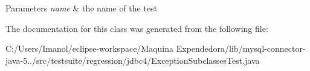 \begin{DoxyParams}{Parameters}
{\em name} & the name of the test \\
\hline
\end{DoxyParams}


The documentation for this class was generated from the following file\+:\begin{DoxyCompactItemize}
\item 
C\+:/\+Users/\+Imanol/eclipse-\/workspace/\+Maquina Expendedora/lib/mysql-\/connector-\/java-\/5../src/testsuite/regression/jdbc4/Exception\+Subclasses\+Test.\+java\end{DoxyCompactItemize}
